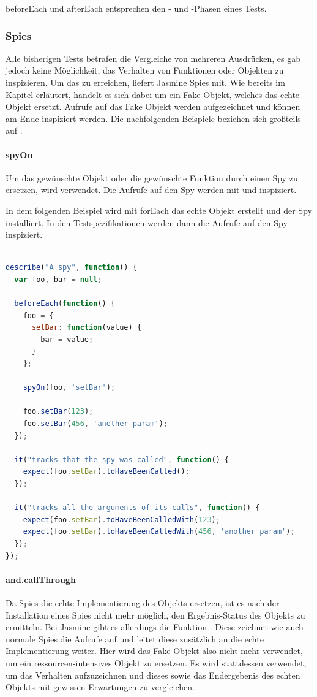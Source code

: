 beforeEach und afterEach entsprechen den - und -Phasen eines Tests.

\subsubsection{Spies}
Alle bisherigen Tests betrafen die Vergleiche von mehreren Ausdrücken, es gab jedoch keine Möglichkeit, das Verhalten von Funktionen oder Objekten zu inspizieren. Um das zu erreichen, liefert Jasmine Spies mit. Wie bereits im Kapitel  erläutert, handelt es sich dabei um ein Fake Objekt, welches das echte Objekt ersetzt. Aufrufe auf das Fake Objekt werden aufgezeichnet und können am Ende inspiziert werden. Die nachfolgenden Beispiele beziehen sich großteils auf \cite{Jasmine}.

\paragraph{spyOn}
Um das gewünschte Objekt oder die gewünschte Funktion durch einen Spy zu ersetzen, wird  verwendet. Die Aufrufe auf den Spy werden mit  und  inspiziert.

In dem folgenden Beispiel wird mit forEach das echte Objekt erstellt und der Spy installiert. In den Testspezifikationen werden dann die Aufrufe auf den Spy inspiziert.

\begin{lstlisting}[language=JavaScript]

describe("A spy", function() {
  var foo, bar = null;

  beforeEach(function() {
    foo = {
      setBar: function(value) {
        bar = value;
      }
    };

    spyOn(foo, 'setBar');

    foo.setBar(123);
    foo.setBar(456, 'another param');
  });

  it("tracks that the spy was called", function() {
    expect(foo.setBar).toHaveBeenCalled();
  });

  it("tracks all the arguments of its calls", function() {
    expect(foo.setBar).toHaveBeenCalledWith(123);
    expect(foo.setBar).toHaveBeenCalledWith(456, 'another param');
  });
});

\end{lstlisting}

\paragraph{and.callThrough}
Da Spies die echte Implementierung des Objekts ersetzen, ist es nach der Installation eines Spies nicht mehr möglich, den Ergebnis-Status des Objekts zu ermitteln. Bei Jasmine gibt es allerdings die Funktion . Diese zeichnet wie auch normale Spies die Aufrufe auf und leitet diese zusätzlich an die echte Implementierung weiter. Hier wird das Fake Objekt also nicht mehr verwendet, um ein ressourcen-intensives Objekt zu ersetzen. Es wird stattdessen verwendet, um das Verhalten aufzuzeichnen und dieses sowie das Endergebenis des echten Objekts mit gewissen Erwartungen zu vergleichen.

